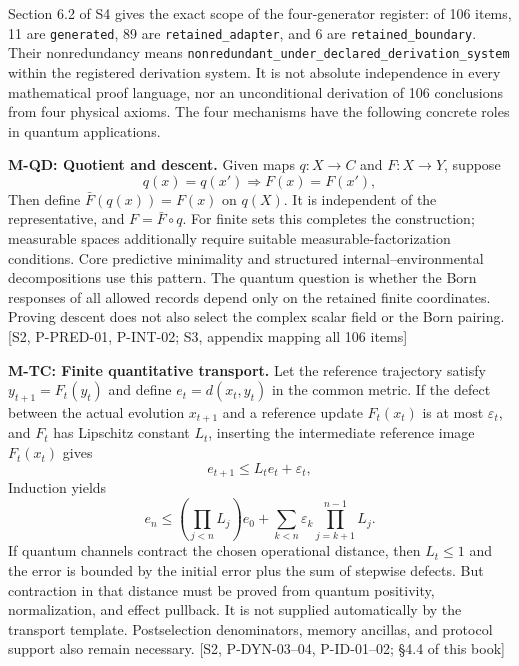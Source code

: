 \documentclass[
  11pt,
  oneside]{book}
\begin{document}
Section 6.2 of S4 gives the exact scope of the four-generator register:
of 106 items, 11 are \texttt{generated}, 89 are
\texttt{retained\_\allowbreak adapter}, and 6 are \texttt{retained\_\allowbreak boundary}. Their
nonredundancy means
\texttt{nonredundant\_\allowbreak under\_\allowbreak declared\_\allowbreak derivation\_\allowbreak system} within the
registered derivation system. It is not absolute independence in every
mathematical proof language, nor an unconditional derivation of 106
conclusions from four physical axioms. The four mechanisms have the
following concrete roles in quantum applications.

\textbf{M-QD: Quotient and descent.} Given maps \(q:X\to C\) and
\(F:X\to Y\), suppose \[
q(x)=q(x')\Longrightarrow F(x)=F(x'),
\] Then define \(\bar F(q(x))=F(x)\) on \(q(X)\). It is independent of
the representative, and \(F=\bar F\circ q\). For finite sets this
completes the construction; measurable spaces additionally require
suitable measurable-factorization conditions. Core predictive minimality
and structured internal--environmental decompositions use this pattern.
The quantum question is whether the Born responses of all allowed
records depend only on the retained finite coordinates. Proving descent
does not also select the complex scalar field or the Born pairing.
{[}S2, P-PRED-01, P-INT-02; S3, appendix mapping all 106 items{]}

\textbf{M-TC: Finite quantitative transport.} Let the reference
trajectory satisfy \(y_{t+1}=F_t(y_t)\) and define \(e_t=d(x_t,y_t)\) in
the common metric. If the defect between the actual evolution
\(x_{t+1}\) and a reference update \(F_t(x_t)\) is at most
\(\varepsilon_t\), and \(F_t\) has Lipschitz constant \(L_t\), inserting
the intermediate reference image \(F_t(x_t)\) gives \[
e_{t+1}\le L_te_t+\varepsilon_t,
\] Induction yields \[
e_n\le\left(\prod_{j<n}L_j\right)e_0+
\sum_{k<n}\varepsilon_k\prod_{j=k+1}^{n-1}L_j.
\] If quantum channels contract the chosen operational distance, then
\(L_t\le1\) and the error is bounded by the initial error plus the sum
of stepwise defects. But contraction in that distance must be proved
from quantum positivity, normalization, and effect pullback. It is not
supplied automatically by the transport template. Postselection
denominators, memory ancillas, and protocol support also remain
necessary. {[}S2, P-DYN-03--04, P-ID-01--02; §4.4 of this book{]}
\end{document}
